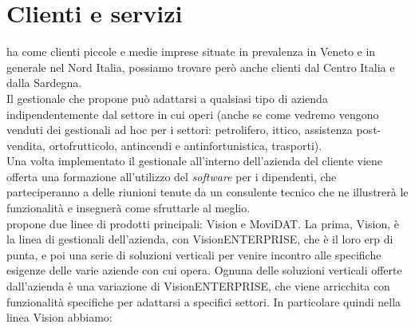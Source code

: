 \section{Clienti e servizi}
{\company} ha come clienti piccole e medie imprese situate in prevalenza in Veneto e in generale nel Nord Italia, possiamo trovare però 
anche clienti dal Centro Italia e dalla Sardegna. \\
Il gestionale che propone può adattarsi a qualsiasi tipo di azienda indipendentemente dal settore in cui 
operi (anche se come vedremo vengono venduti dei gestionali ad hoc per i settori: petrolifero, ittico, assistenza post-vendita, ortofrutticolo, antincendi 
e antinfortunistica, trasporti).\\ Una volta implementato il gestionale all'interno dell'azienda del cliente viene offerta una formazione all'utilizzo del 
\textit{software} per i dipendenti, che parteciperanno a delle riunioni tenute da un consulente tecnico che ne illustrerà le funzionalità e insegnerà come sfruttarle 
al meglio.\\
{\company} propone due linee di prodotti principali: Vision e MoviDAT.
La prima, Vision, è la linea di gestionali dell'azienda, con VisionENTERPRISE, che è il loro \gls{erp} di punta, 
e poi una serie di soluzioni verticali per venire incontro alle specifiche esigenze delle varie aziende con cui {\company} opera.
Ognuna delle soluzioni verticali offerte dall'azienda è una variazione di VisionENTERPRISE, che viene arricchita con 
funzionalità specifiche per adattarsi a specifici settori. In particolare quindi nella linea Vision abbiamo:
